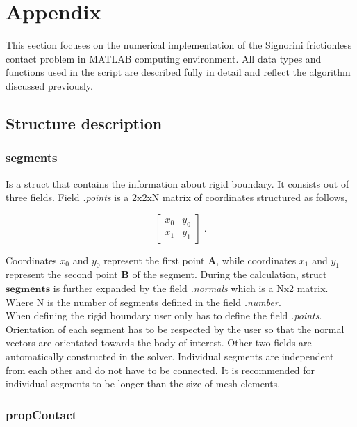\documentclass[10pt,a4paper]{article}
\begin{document}
\section{Appendix}

This section focuses on the numerical implementation of the Signorini frictionless contact problem in MATLAB computing environment. All data types and functions used in the script are described fully in detail and reflect the algorithm discussed previously. 

\subsection{Structure description}


\subsubsection{segments} 

Is a struct that contains the information about rigid boundary. It consists out of three fields. Field \textit{.points} is a 2x2xN matrix of coordinates structured as follows,

\begin{equation}
	\left[ \begin{array}{cc}
		x_0 & y_0\\
		x_1 & y_1
    \end{array}	 \right] \;. \label{eq:segments_struct}
\end{equation}

Coordinates $x_0$ and $y_0$ represent the first point $\mathbf{A}$, while coordinates $x_1$ and $y_1$ represent the second point $\mathbf{B}$ of the segment. During the calculation, struct $\textbf{segments}$ is further expanded by the field \textit{.normals} which is a Nx2 matrix. Where N is the number of segments defined in the field \textit{.number}.\\

When defining the rigid boundary user only has to define the field \textit{.points}. Orientation of each segment has to be respected by the user so that the normal vectors are orientated towards the body of interest. Other two fields are automatically constructed in the solver. Individual segments are independent from each other and do not have to be connected. It is recommended for individual segments to be longer than the size of mesh elements.


\subsubsection{propContact}
\end{document}
